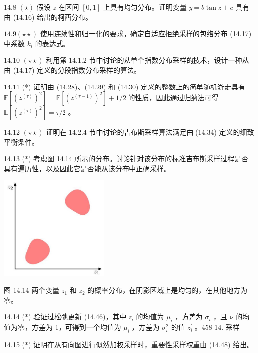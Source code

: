 \documentclass[10pt]{report}
\begin{document}
14.8 \(\left( \star \right)\) 假设 \(z\) 在区间 \(\left\lbrack  {0,1}\right\rbrack\) 上具有均匀分布。证明变量 \(y = b\tan z + c\) 具有由 (14.16) 给出的柯西分布。

\({14.9}\left( {\star  \star  }\right)\) 使用连续性和归一化的要求，确定自适应拒绝采样的包络分布 (14.17) 中系数 \({k}_{i}\) 的表达式。

14.10 \(\left( {\star  \star  }\right)\) 利用第 14.1.2 节中讨论的从单个指数分布采样的技术，设计一种从由 (14.17) 定义的分段指数分布采样的算法。

14.11 (*) 证明由 (14.28)、(14.29) 和 (14.30) 定义的整数上的简单随机游走具有 \(\mathbb{E}\left\lbrack  {\left( {z}^{\left( \tau \right) }\right) }^{2}\right\rbrack   = \mathbb{E}\left\lbrack  {\left( {z}^{\left( \tau  - 1\right) }\right) }^{2}\right\rbrack   + 1/2\) 的性质，因此通过归纳法可得 \(\mathbb{E}\left\lbrack  {\left( {z}^{\left( \tau \right) }\right) }^{2}\right\rbrack   = \tau /2\) 。

14.12 \(\left( {\star  \star  }\right)\) 证明在 14.2.4 节中讨论的吉布斯采样算法满足由 (14.34) 定义的细致平衡条件。

14.13 (*) 考虑图 14.14 所示的分布。讨论针对该分布的标准吉布斯采样过程是否具有遍历性，以及因此它是否能从该分布中正确采样。

\begin{center}
\includegraphics[max width=0.4\textwidth]{images/0194e279-9b28-703a-88f4-c3ac21e2010d_476_1015_1358_502_481_0.jpg}
\end{center}
\hspace*{3em} 

图 14.14 两个变量 \({z}_{1}\) 和 \({z}_{2}\) 的概率分布，在阴影区域上是均匀的，在其他地方为零。

14.14 (*) 验证过松弛更新 (14.46)，其中 \({z}_{i}\) 的均值为 \({\mu }_{i}\) ，方差为 \({\sigma }_{i}\) ，且 \(\nu\) 的均值为零，方差为 1，可得到一个均值为 \({\mu }_{i}\) ，方差为 \({\sigma }_{i}^{2}\) 的值 \({z}_{i}^{\prime }\) 。458 14. 采样

14.15 (*) 证明在从有向图进行似然加权采样时，重要性采样权重由 (14.48) 给出。
\end{document}
